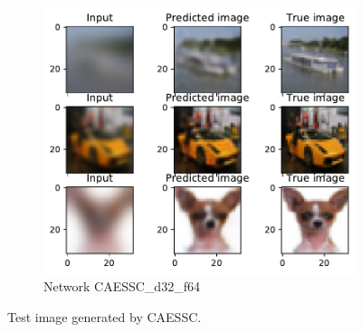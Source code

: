\begin{figure}[H]
\begin{subfigure}{\textwidth}
        \includegraphics[height=0.35\textheight,keepaspectratio]{subsections/caessc/d36_f64.pdf}
        \caption{Network CAESSC\_d32\_f64}            
    \end{subfigure}
    
    \caption{Test image generated by CAESSC.}
\end{figure}

